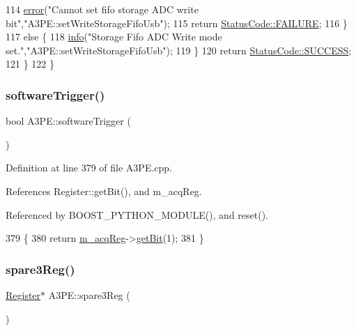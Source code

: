 \begin{DoxyCode}
114       \hyperlink{classObject_a204a95f57818c0f811933917a30eff45}{error}(\textcolor{stringliteral}{"Cannot set fifo storage ADC write bit"},\textcolor{stringliteral}{"A3PE::setWriteStorageFifoUsb"});
115       \textcolor{keywordflow}{return} \hyperlink{classStatusCode_a6f565cbeadc76d14c72f047e5e85eb4ba3da73d4c469762eb9d3c960368252b26}{StatusCode::FAILURE};
116     \}
117     \textcolor{keywordflow}{else} \{
118       \hyperlink{classObject_a644fd329ea4cb85f54fa6846484b84a8}{info}(\textcolor{stringliteral}{"Storage Fifo ADC Write mode set."},\textcolor{stringliteral}{"A3PE::setWriteStorageFifoUsb"});
119     \}
120     \textcolor{keywordflow}{return} \hyperlink{classStatusCode_a6f565cbeadc76d14c72f047e5e85eb4badd0da38d3ba0d922efd1f4619bc37ad8}{StatusCode::SUCCESS};
121   \}
122 \}
\end{DoxyCode}
\mbox{\label{classA3PE_acb2ccd6b78b39a0a9e360439b3b6f4c7}} 
\subsubsection{\texorpdfstring{software\+Trigger()}{softwareTrigger()}}
{\footnotesize\ttfamily bool A3\+P\+E\+::software\+Trigger (\begin{DoxyParamCaption}{ }\end{DoxyParamCaption})}



Definition at line 379 of file A3\+P\+E.\+cpp.



References Register\+::get\+Bit(), and m\+\_\+acq\+Reg.



Referenced by B\+O\+O\+S\+T\+\_\+\+P\+Y\+T\+H\+O\+N\+\_\+\+M\+O\+D\+U\+L\+E(), and reset().


\begin{DoxyCode}
379                           \{
380   \textcolor{keywordflow}{return} \hyperlink{classA3PE_abaf426f4c9192537117b77f9f4821e04}{m\_acqReg}->\hyperlink{classRegister_a5d27c9ff548817eee097ba4fdc8e8f69}{getBit}(1);
381 \}
\end{DoxyCode}
\mbox{\label{classA3PE_a979a9ac462eb55e611f6de4e94bad18e}} 
\subsubsection{\texorpdfstring{spare3\+Reg()}{spare3Reg()}}
{\footnotesize\ttfamily \hyperlink{classRegister}{Register}$\ast$ A3\+P\+E\+::spare3\+Reg (\begin{DoxyParamCaption}{ }\end{DoxyParamCaption})\hspace{0.3cm}{\ttfamily [inline]}}



